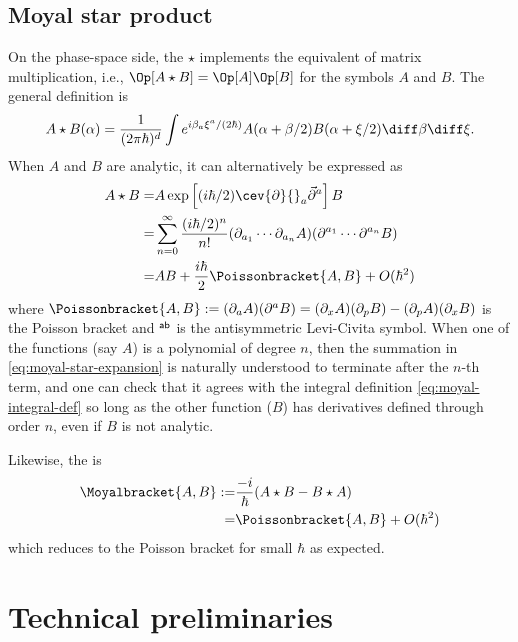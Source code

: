 \documentclass{article}
\numberwithin{equation}{section}
\begin{document}
\subsection{Moyal star product}

On the phase-space side, the 
$\star$ implements the equivalent of matrix multiplication,
i.e., $\Op[A\star B] = \Op[A]  \Op[B]$ for 
the symbols $A$ and $B$. 
The general definition is
\begin{align}\label{eq:moyal-integral-def}
	A \star B(\alpha) = \frac{1}{(2\pi \hbar)^{d}} \int e^{i\beta_a\xi^a/(2\hbar)} A(\alpha+\beta/2)B(\alpha+\xi/2) \diff\beta\diff\xi.
\end{align}
When $A$ and $B$ are analytic, it can alternatively be expressed as
\begin{align}\label{eq:moyal-series-def}
	A \star B=& A \exp\left[(i\hbar/2) \cev{\partial}{}_a \vec{\partial} {}^a\right] B \\
	\label{eq:moyal-star-expansion}
	=&\sum_{n=0}^\infty \frac{(i\hbar/2)^n}{n!}  (\partial_{a_1} \cdots \partial_{a_n} A)(\partial^{a_1} \cdots \partial^{a_n} B)\\
	=& A B + \frac{i\hbar}{2} \Poissonbracket{A,B} + O(\hbar^2)
\end{align}
where $\Poissonbracket{A,B} := (\partial_a A) (\partial^a B) = (\partial_x A) (\partial_p B)-(\partial_p A) (\partial_x B) $ is the Poisson bracket and $\sf^{ab}$ is the antisymmetric Levi-Civita symbol.
When one of the functions (say $A$) is a polynomial of degree $n$, then the summation in \eqref{eq:moyal-star-expansion} is naturally understood to terminate after the $n$-th term, and one can check that it agrees with the integral definition \eqref{eq:moyal-integral-def} so long as the other function ($B$) has derivatives defined through order $n$, even if $B$ is not analytic.



Likewise, the  is
\begin{align}
	\Moyalbracket{A, B} := & \frac{-i}{\hbar}(A \star B - B \star A) \\
	=& \Poissonbracket{A,B} + O(\hbar^2)
\end{align}
which reduces to the Poisson bracket for small $\hbar$ as expected.

\section{Technical preliminaries}\label{sec:tech-prelim}
\end{document}
